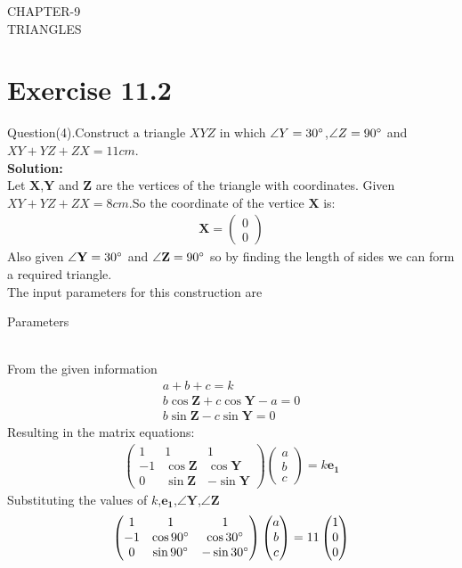 \documentclass{article}
\newcommand{\myvec}[1]{\ensuremath{\begin{pmatrix}#1\end{pmatrix}}}
\let\vec\mathbf
\begin{document}
\begin{center}
        \textbf\large{CHAPTER-9 \\ TRIANGLES}
\end{center}
\section{Exercise 11.2}
Question(4).Construct a triangle $XYZ$ in which $\angle{Y}=30\degree$,$\angle{Z}=90\degree$ and $XY+YZ+ZX=11cm$. \\
\textbf{Solution:}\\
Let $\vec{X}$,$\vec{Y}$ and $\vec{Z}$ are the vertices of the triangle with coordinates.
Given $XY+YZ+ZX=8cm$.So the coordinate of the vertice  $\vec{X}$ is:
\begin{align}
{
\vec{X} =\myvec{0\\0}
}
\end{align}
Also given $\angle{\vec{Y}}=30\degree$ and $\angle{\vec{Z}}=90\degree$ so by finding the length of sides we can form a required triangle. \\
 The input parameters for this construction are\\
 \begin{table}[h]
	 \centering
	 
	 \caption{Parameters}
	 \label{tab:table1}
 \end{table}\\
From the given information\\
 \begin{align}
     a+b+c=k\\
	 b\cos{\vec{Z}}+c\cos{\vec{Y}}-a=0\\
	 b\sin{\vec{Z}}-c\sin{\vec{Y}}=0
 \end{align}
 Resulting in the matrix equations:
 \begin{align}
	 \myvec{1 & 1 & 1\\-1 & \cos{\vec{Z}} & \cos{\vec{Y}}\\0 & \sin{\vec{Z}} & -\sin{\vec{Y}}}\myvec{a \\ b \\ c}=k\vec{e_1}
 \end{align}
 Substituting the values of $k$,$\vec{e_1}$,$\angle{\vec{Y}}$,$\angle{\vec{Z}}$
 \begin{align}
     \myvec{1 & 1 & 1\\-1 & \cos{90\degree} & \cos{30\degree}\\ 0 & \sin{90\degree} & -\sin{30\degree}}\myvec{a \\ b \\ c}= 11\myvec{1 \\ 0 \\ 0 }
 \end{align}
\end{document}
